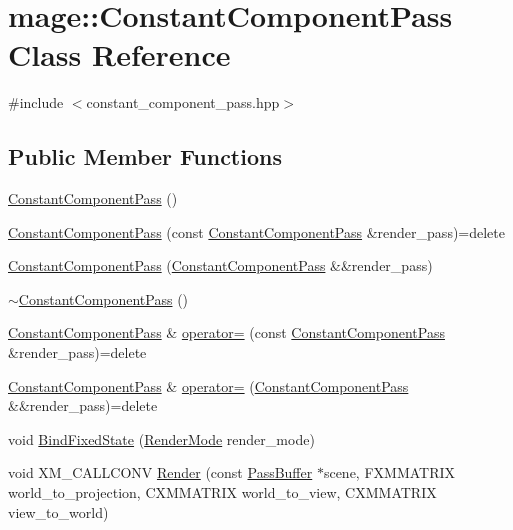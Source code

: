 \hypertarget{classmage_1_1_constant_component_pass}{}\section{mage\+:\+:Constant\+Component\+Pass Class Reference}
\label{classmage_1_1_constant_component_pass}


{\ttfamily \#include $<$constant\+\_\+component\+\_\+pass.\+hpp$>$}

\subsection*{Public Member Functions}
\begin{DoxyCompactItemize}
\item 
\hyperlink{classmage_1_1_constant_component_pass_acd197274863c82c9f1551c7e6171e4c9}{Constant\+Component\+Pass} ()
\item 
\hyperlink{classmage_1_1_constant_component_pass_ac3112acde3a0504febef699873efe1ff}{Constant\+Component\+Pass} (const \hyperlink{classmage_1_1_constant_component_pass}{Constant\+Component\+Pass} \&render\+\_\+pass)=delete
\item 
\hyperlink{classmage_1_1_constant_component_pass_a350d68fd2f8f17797361e7567d0337c7}{Constant\+Component\+Pass} (\hyperlink{classmage_1_1_constant_component_pass}{Constant\+Component\+Pass} \&\&render\+\_\+pass)
\item 
\hyperlink{classmage_1_1_constant_component_pass_aaa94607b422672dab4cb77f129382d1b}{$\sim$\+Constant\+Component\+Pass} ()
\item 
\hyperlink{classmage_1_1_constant_component_pass}{Constant\+Component\+Pass} \& \hyperlink{classmage_1_1_constant_component_pass_a513b83527fdb17a760032b76f3c17012}{operator=} (const \hyperlink{classmage_1_1_constant_component_pass}{Constant\+Component\+Pass} \&render\+\_\+pass)=delete
\item 
\hyperlink{classmage_1_1_constant_component_pass}{Constant\+Component\+Pass} \& \hyperlink{classmage_1_1_constant_component_pass_ab1944cfe6c59d28d34fb6c6d05bd0b96}{operator=} (\hyperlink{classmage_1_1_constant_component_pass}{Constant\+Component\+Pass} \&\&render\+\_\+pass)=delete
\item 
void \hyperlink{classmage_1_1_constant_component_pass_a87e9d62d5d93b1a66388ab0ccd494e8b}{Bind\+Fixed\+State} (\hyperlink{namespacemage_a5e7e18b0154373ce8fc942fe3f6b27fd}{Render\+Mode} render\+\_\+mode)
\item 
void X\+M\+\_\+\+C\+A\+L\+L\+C\+O\+NV \hyperlink{classmage_1_1_constant_component_pass_aeee741bd38f3e2ae8eea488e91eea72e}{Render} (const \hyperlink{structmage_1_1_pass_buffer}{Pass\+Buffer} $\ast$scene, F\+X\+M\+M\+A\+T\+R\+IX world\+\_\+to\+\_\+projection, C\+X\+M\+M\+A\+T\+R\+IX world\+\_\+to\+\_\+view, C\+X\+M\+M\+A\+T\+R\+IX view\+\_\+to\+\_\+world)
\end{DoxyCompactItemize}

